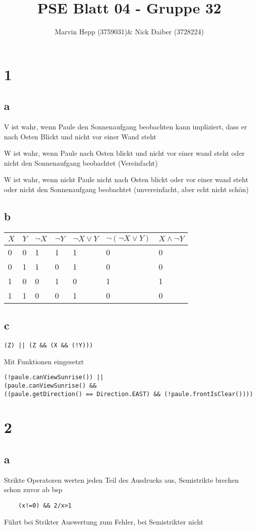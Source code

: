\documentclass{article}
\title{PSE Blatt 04 - Gruppe 32}
\author{Marvin Hepp (3759031)\& Nick Daiber (3728224)}
\begin{document}
\maketitle

\section*{1}
\subsection*{a}
V ist wahr, wenn Paule den Sonnenaufgang beobachten kann impliziert,
dass er nach Osten Blickt und nicht vor einer Wand steht

W ist wahr, wenn Paule nach Osten blickt und nicht vor einer wand steht oder
nicht den Sonnenaufgang beobachtet (Vereinfacht)

W ist wahr, wenn nicht Paule nicht nach Osten blickt oder vor einer wand steht oder
nicht den Sonnenaufgang beobachtet (unvereinfacht, aber echt nicht schön)
\subsection*{b}
\begin{tabular}{l|l|l|l|l|l|l}
    $X$&$Y$&$\neg X$&$\neg Y$&$\neg X \lor Y$&$\neg(\neg X \lor Y)$&$X\land \neg Y$\\
    \hline
    0&0&1&1&1&0&0\\
    0&1&1&0&1&0&0\\
    1&0&0&1&0&1&1\\
    1&1&0&0&1&0&0\\
\end{tabular}
\subsection*{c}
\begin{lstlisting}
(Z) || (Z && (X && (!Y)))
\end{lstlisting}

Mit Funktionen eingesetzt
\begin{lstlisting}
(!paule.canViewSunrise()) || 
(paule.canViewSunrise() && 
((paule.getDirection() == Direction.EAST) && (!paule.frontIsClear())))
\end{lstlisting}

\newpage
\section*{2}
\subsection*{a}
Strikte Operatoren werten jeden Teil des Ausdrucks aus,
Semistrikte brechen schon zuvor ab bsp 
\begin{lstlisting}
    (x!=0) && 2/x>1
\end{lstlisting}
Führt bei Strikter Auswertung zum Fehler, bei Semistrikter nicht
\end{document}
